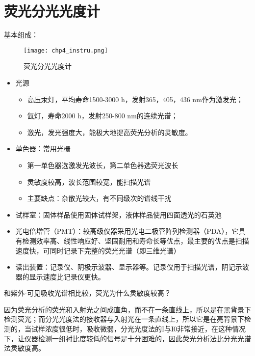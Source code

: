 \section{荧光分光光度计}
基本组成： 
\begin{figure}[ht]
	\centering
	\texttt{[image: chp4\_instru.png]}
	\label{fig:chp4instru}
	\caption{荧光分光光度计}
\end{figure}
\begin{itemize}
	\item 光源
	\begin{itemize}
		\item 高压汞灯，平均寿命1500-3000 h，发射365，405，436 nm作为激发光；
		\item 氙灯，寿命2000 h，发射250-800 nm的连续光谱；
		\item 激光，发光强度大，能极大地提高荧光分析的灵敏度。
	\end{itemize}
	\item 单色器：常用光栅
	\begin{itemize}
		\item 第一单色器选激发光波长，第二单色器选荧光波长
		\item 灵敏度较高，波长范围较宽，能扫描光谱
		\item 主要缺点：杂散光较大，有不同级次的谱线干扰
	\end{itemize}
	\item 试样室：固体样品使用固体试样架，液体样品使用四面透光的石英池
	\item 光电倍增管（PMT）：较高级仪器采用光电二极管阵列检测器（PDA），它具有检测效率高、线性响应好、坚固耐用和寿命长等优点，最主要的优点是扫描速度快，可同时记录下完整的荧光光谱（即三维光谱）
	\item 读出装置：记录仪、阴极示波器、显示器等。记录仪用于扫描光谱，阴记示波器的显示速度比记录仪更快。
\end{itemize}

\begin{note}
	和紫外-可见吸收光谱相比较，荧光为什么灵敏度较高？

	因为荧光分析的荧光和入射光之间成直角，而不在一条直线上，所以是在黑背景下检测荧光；而分光光度法的接收器与入射光在一条直线上，所以它是在亮背景下检测的，当试样浓度很低时，吸收微弱，分光光度法的I与I0非常接近，在这种情况下，让仪器检测一组衬比度较低的信号是十分困难的，因此荧光分析法比分光光谱法灵敏度高。
\end{note}
